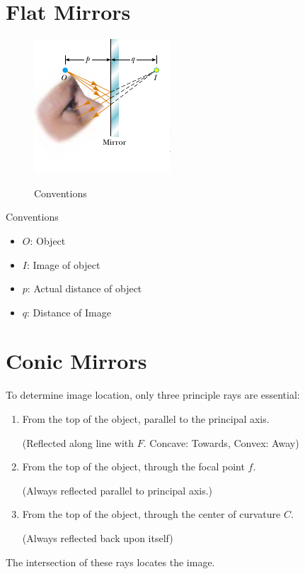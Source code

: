 \documentclass[a4paper,10pt]{report}
\begin{document}
\section{Flat Mirrors}
  \begin{figure}[htpb]
  \begin{centering}
  \begin{center}
  \includegraphics[]{./pqmirror.png}
  \label{fig:parallel_diagram}
  \caption{Conventions}
  \end{center}
  \par\end{centering}
  \end{figure}
  Conventions
  \begin{itemize}
   \item $O$: Object
   \item $I$: Image of object
   \item $p$: Actual distance of object
   \item $q$: Distance of Image
  \end{itemize}

\section{Conic Mirrors}
To determine image location, only three principle rays are essential:
\begin{enumerate}
 \item
    From the top of the object, parallel to the principal axis.

    (Reflected along line with $F$. Concave: Towards, Convex: Away)
 \item
    From the top of the object, through the focal point $f$.

    (Always reflected parallel to principal axis.)
 \item
    From the top of the object, through the center of curvature $C$.

    (Always reflected back upon itself)
\end{enumerate}
The intersection of these rays locates the image.
\end{document}
